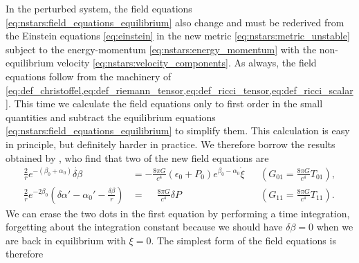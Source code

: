 In the perturbed system, the field equations \eqref{eq:nstars:field_equations_equilibrium} also change and must be rederived from the Einstein equations \eqref{eq:einstein} in the new metric \eqref{eq:nstars:metric_unstable} subject to the energy-momentum \eqref{eq:nstars:energy_momentum} with the non-equilibrium velocity \eqref{eq:nstars:velocity_components}.
As always, the field equations follow from the machinery of \cref{eq:def_christoffel,eq:def_riemann_tensor,eq:def_ricci_tensor,eq:def_ricci_scalar}.
This time we calculate the field equations only to first order in the small quantities and subtract the equilibrium equations \eqref{eq:nstars:field_equations_equilibrium} to simplify them.
This calculation is easy in principle, but definitely harder in practice.
We therefore borrow the results obtained by \cite[§26.4d]{ref:mtw}, who find that two of the new field equations are
\begin{subequations}
\begin{align}
	\frac{2}{r} e^{-(\beta_0 + \alpha_0)} \dot{\delta\beta}                                     &= - \frac{8 \pi G}{c^4} (\epsilon_0 + P_0) e^{\beta_0 - \alpha_0} \dot\xi                         && \left( G_{01} = \frac{8 \pi G}{c^4} T_{01} \right) , \\
	\frac{2}{r} e^{-2\beta_0} \left( \delta\alpha' - \alpha_0' - \frac{\delta \beta}{r} \right) &= \phantom{-} \frac{8 \pi G}{c^4} \delta P                                                                    && \left( G_{11} = \frac{8 \pi G}{c^4} T_{11} \right) .
\end{align}
\end{subequations}
We can erase the two dots in the first equation by performing a time integration, forgetting about the integration constant because we should have $\delta\beta=0$ when we are back in equilibrium with $\xi=0$.
The simplest form of the field equations is therefore
